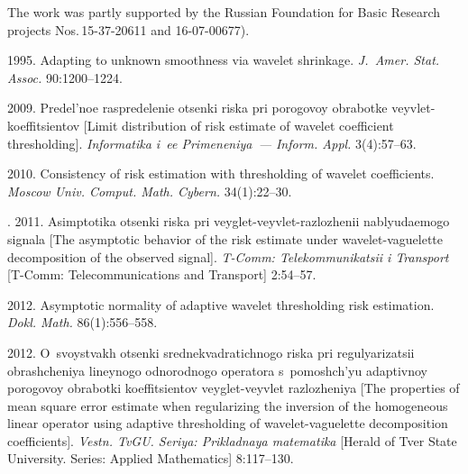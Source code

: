 

\vspace*{-8pt}

\Ack
\noindent
The work was partly supported by the Russian Foundation
for Basic Research projects Nos.\,15-37-20611 and
16-07-00677).



\vspace*{3pt}

  \begin{multicols}{2}

\renewcommand{\bibname}{\protect\rmfamily References}

{\small\frenchspacing
 {%
 \begin{thebibliography}{99}

 1995. Adapting to unknown smoothness via
 wavelet shrinkage. \textit{J.~Amer. Stat. Assoc.} 90:1200--1224.
 
 2009. Predel'noe raspredelenie otsenki riska pri 
porogovoy obrabotke veyvlet-koeffitsientov [Limit distribution of risk estimate 
of wavelet coefficient thresholding]. \textit{Informatika i~ee Primeneniya~--- 
Inform. Appl.}  3(4):57--63.

 2010. Consistency of risk estimation 
with thresholding of wavelet coefficients. \textit{Moscow Univ. Comput. Math. 
Cybern.} 34(1):22--30.


. 2011. Asimptotika otsenki riska pri 
veyglet-veyvlet-razlozhenii nablyudaemogo signala 
[The asymptotic behavior of the risk estimate under wavelet-vaguelette 
decomposition of the observed signal]. \textit{T-Comm: Telekommunikatsii i Transport}
[T-Comm: Telecommunications and Transport] 2:54--57.



 2012. Asymptotic normality of adaptive wavelet thresholding 
risk estimation. \textit{Dokl. Math.} 86(1):556--558.

 2012. O~svoystvakh otsenki sred\-ne\-kvad\-ra\-ti\-ch\-no\-go riska pri 
regulyarizatsii obrashcheniya lineynogo odnorodnogo operatora s~pomoshch'yu adaptivnoy 
porogovoy obrabotki koeffitsientov veyglet-veyvlet razlozheniya 
[The properties of mean square error estimate when regularizing the inversion of the homogeneous 
linear operator using adaptive thresholding of wavelet-vaguelette decomposition 
coefficients]. \textit{Vestn. TvGU. Seriya: Prikladnaya matematika} 
[Herald of Tver State University. Series: Applied Mathematics] 8:117--130.


\end{thebibliography}}}
\end{multicols}
